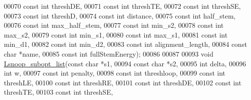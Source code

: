\begin{DoxyCode}
00070                    \textcolor{keyword}{const} \textcolor{keywordtype}{int}  threshDE,
00071                    \textcolor{keyword}{const} \textcolor{keywordtype}{int}  threshTE,
00072                    \textcolor{keyword}{const} \textcolor{keywordtype}{int}  threshSE,
00073                    \textcolor{keyword}{const} \textcolor{keywordtype}{int}  threshD,
00074                    \textcolor{keyword}{const} \textcolor{keywordtype}{int}  distance,
00075                    \textcolor{keyword}{const} \textcolor{keywordtype}{int}  half\_stem,
00076                    \textcolor{keyword}{const} \textcolor{keywordtype}{int}  max\_half\_stem,
00077                    \textcolor{keyword}{const} \textcolor{keywordtype}{int}  min\_s2,
00078                    \textcolor{keyword}{const} \textcolor{keywordtype}{int}  max\_s2,
00079                    \textcolor{keyword}{const} \textcolor{keywordtype}{int}  min\_s1,
00080                    \textcolor{keyword}{const} \textcolor{keywordtype}{int}  max\_s1,
00081                    \textcolor{keyword}{const} \textcolor{keywordtype}{int}  min\_d1,
00082                    \textcolor{keyword}{const} \textcolor{keywordtype}{int}  min\_d2,
00083                    \textcolor{keyword}{const} \textcolor{keywordtype}{int}  alignment\_length,
00084                    \textcolor{keyword}{const} \textcolor{keywordtype}{char} *name,
00085                    \textcolor{keyword}{const} \textcolor{keywordtype}{int}  fullStemEnergy);
00086 
00087 
00093 \textcolor{keywordtype}{void} \mbox{\hyperlink{snoop_8h_a202fa5d46b084be710e7a07ff490979a}{Lsnoop\_subopt\_list}}(\textcolor{keyword}{const} \textcolor{keywordtype}{char}  *s1,
00094                         \textcolor{keyword}{const} \textcolor{keywordtype}{char}  *s2,
00095                         \textcolor{keywordtype}{int}         delta,
00096                         \textcolor{keywordtype}{int}         w,
00097                         \textcolor{keyword}{const} \textcolor{keywordtype}{int}   penalty,
00098                         \textcolor{keyword}{const} \textcolor{keywordtype}{int}   threshloop,
00099                         \textcolor{keyword}{const} \textcolor{keywordtype}{int}   threshLE,
00100                         \textcolor{keyword}{const} \textcolor{keywordtype}{int}   threshRE,
00101                         \textcolor{keyword}{const} \textcolor{keywordtype}{int}   threshDE,
00102                         \textcolor{keyword}{const} \textcolor{keywordtype}{int}   threshTE,
00103                         \textcolor{keyword}{const} \textcolor{keywordtype}{int}   threshSE,

\end{DoxyCode}
